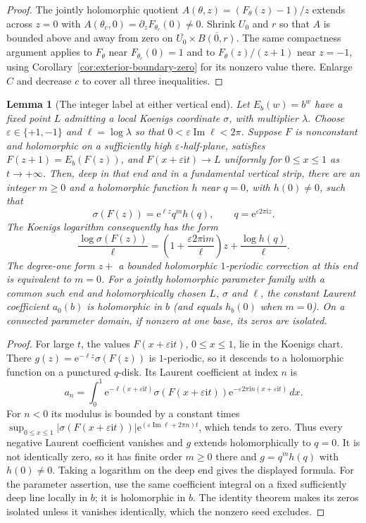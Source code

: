 \documentclass[11pt,a4paper]{article}
\newtheorem{lemma}[theorem]{Lemma}
\theoremstyle{definition}
\newcommand{\eee}{\mathrm{e}}
\newcommand{\ii}{\mathrm{i}}
\begin{document}
\begin{proof}
The jointly holomorphic quotient
$A(\theta,z)=(F_\theta(z)-1)/z$ extends across $z=0$ with
$A(\theta_c,0)=\partial_zF_{\theta_c}(0)\ne0$.
Shrink $U_0$ and $r$ so that $A$ is bounded above and away from
zero on $\overline{U_0}\times\overline{B(0,r)}$.
The same compactness argument applies to $F_\theta$ near
$F_{\theta_c}(0)=1$ and to
$F_\theta(z)/(z+1)$ near $z=-1$, using
Corollary~\ref{cor:exterior-boundary-zero} for its nonzero value there.
Enlarge $C$ and decrease $c$ to cover all three inequalities.
\end{proof}

\begin{lemma}[The integer label at either vertical end]\label{lem:end-spectrum}
Let $E_b(w)=b^w$ have a fixed point $L$ admitting a local Koenigs
coordinate $\sigma$, with multiplier $\lambda$.  Choose
$\varepsilon\in\{+1,-1\}$ and $\ell=\log\lambda$ so that
$0<\varepsilon\operatorname{Im}\ell<2\pi$.
Suppose $F$ is nonconstant and holomorphic on a sufficiently high
$\varepsilon$-half-plane, satisfies $F(z+1)=E_b(F(z))$, and
$F(x+\varepsilon\ii t)\to L$ uniformly for $0\le x\le1$ as
$t\to+\infty$.  Then, deep in that end and in a fundamental vertical
strip, there are an integer $m\ge0$ and a holomorphic function $h$
near $q=0$, with $h(0)\ne0$, such that
\[
 \sigma(F(z))=\eee^{\ell z}q^m h(q),\qquad
 q=\eee^{\varepsilon2\pi\ii z}.
\]
The Koenigs logarithm consequently has the form
\[
 \frac{\log\sigma(F(z))}{\ell}
 =\left(1+\frac{\varepsilon2\pi\ii m}{\ell}\right)z
  +\frac{\log h(q)}{\ell}.
\]
The degree-one form $z+$ a bounded holomorphic $1$-periodic
correction at this end is equivalent to $m=0$.
For a jointly holomorphic parameter family with a common such end
and holomorphically chosen $L$, $\sigma$ and $\ell$, the constant
Laurent coefficient $a_0(b)$ is holomorphic in $b$ (and equals
$h_b(0)$ when $m=0$).  On a connected parameter domain, if nonzero
at one base, its zeros are isolated.
\end{lemma}

\begin{proof}
For large $t$, the values $F(x+\varepsilon\ii t)$, $0\le x\le1$,
lie in the Koenigs chart.  There
$g(z)=\eee^{-\ell z}\sigma(F(z))$ is $1$-periodic,
so it descends to a holomorphic function on a punctured $q$-disk.
Its Laurent coefficient at index $n$ is
\[
 a_n=\int_0^1\eee^{-\ell(x+\varepsilon\ii t)}
       \sigma(F(x+\varepsilon\ii t))
       \eee^{-\varepsilon2\pi\ii n(x+\varepsilon\ii t)}\,dx.
\]
For $n<0$ its modulus is bounded by a constant times
$\sup_{0\le x\le1}|\sigma(F(x+\varepsilon\ii t))|
 \eee^{(\varepsilon\operatorname{Im}\ell+2\pi n)t}$, which tends to zero.
Thus every negative Laurent coefficient vanishes and $g$ extends
holomorphically to $q=0$.  It is not identically zero, so it has
finite order $m\ge0$ there and $g=q^m h(q)$ with $h(0)\ne0$.
Taking a logarithm on the deep end gives the displayed formula.
For the parameter assertion, use the same coefficient integral on a
fixed sufficiently deep line locally in $b$; it is holomorphic in
$b$.  The identity theorem makes its zeros isolated unless it
vanishes identically, which the nonzero seed excludes.
\end{proof}
\end{document}
